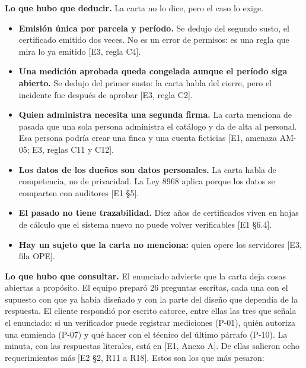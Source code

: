 \documentclass[11pt,letterpaper]{article}
\newcommand{\ev}[1]{\textrm{\small [#1]}}   %
\begin{document}
\textbf{Lo que hubo que deducir.} La carta no lo dice, pero el caso lo exige.

\begin{itemize}
\item \textbf{Emisión única por parcela y período.} Se dedujo del segundo susto, el certificado emitido dos
      veces. No es un error de permisos: es una regla que mira lo ya emitido \ev{E3, regla C4}.
\item \textbf{Una medición aprobada queda congelada aunque el período siga abierto.} Se dedujo del
      primer susto: la carta habla del cierre, pero el incidente fue después de aprobar \ev{E3, regla C2}.
\item \textbf{Quien administra necesita una segunda firma.} La carta menciona de pasada que una sola persona
      administra el catálogo y da de alta al personal. Esa persona podría crear una finca y una cuenta
      ficticias \ev{E1, amenaza AM-05; E3, reglas C11 y C12}.
\item \textbf{Los datos de los dueños son datos personales.} La carta habla de competencia, no de
      privacidad. La Ley 8968 aplica porque los datos se comparten con auditores \ev{E1 §5}.
\item \textbf{El pasado no tiene trazabilidad.} Diez años de certificados viven en hojas de cálculo que
      el sistema nuevo no puede volver verificables \ev{E1 §6.4}.
\item \textbf{Hay un sujeto que la carta no menciona:} quien opere los servidores \ev{E3, fila OPE}.
\end{itemize}

\textbf{Lo que hubo que consultar.} El enunciado advierte que la carta deja cosas abiertas a propósito.
El equipo preparó 26 preguntas escritas, cada una con el supuesto con que ya había diseñado y con la
parte del diseño que dependía de la respuesta. El cliente respondió por escrito catorce, entre ellas
las tres que señala el enunciado: si un verificador puede registrar mediciones (P-01), quién autoriza
una enmienda (P-07) y qué hacer con el técnico del último párrafo (P-10). La minuta, con las
respuestas literales, está en \ev{E1, Anexo A}. De ellas salieron ocho requerimientos más
\ev{E2 §2, R11 a R18}. Estos son los que más pesaron:
\end{document}
